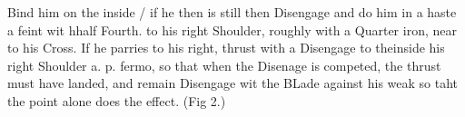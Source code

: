 \exercise{}
Bind him on the inside / if he then is still then Disengage and do him
in a haste a feint wit hhalf Fourth. to his right Shoulder, roughly
with a Quarter iron, near to his Cross. If he parries to his right,
thrust with a Disengage to theinside his right Shoulder a. p. fermo,
so that when the Disenage is competed, the thrust must have landed,
and remain Disengage wit the BLade against his weak so taht the point
alone does the effect. (Fig 2.)

\exercise{}
\exercise{}
\exercise{}
\exercise{}
\exercise{}

